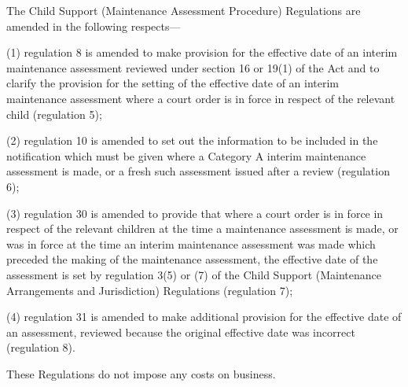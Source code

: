 \documentclass[a4paper]{article}
\begin{document}
 The Child Support (Maintenance Assessment Procedure) Regulations are amended in the following respects—

 (1) regulation 8 is amended to make provision for the effective date of an interim maintenance assessment reviewed under section 16 or 19(1) of the Act and to clarify the provision for the setting of the effective date of an interim maintenance assessment where a court order is in force in respect of the relevant child (regulation 5);

 (2) regulation 10 is amended to set out the information to be included in the notification which must be given where a Category A interim maintenance assessment is made, or a fresh such assessment issued after a review (regulation 6);

 (3) regulation 30 is amended to provide that where a court order is in force in respect of the relevant children at the time a maintenance assessment is made, or was in force at the time an interim maintenance assessment was made which preceded the making of the maintenance assessment, the effective date of the assessment is set by regulation 3(5) or (7) of the Child Support (Maintenance Arrangements and Jurisdiction) Regulations (regulation 7);

 (4) regulation 31 is amended to make additional provision for the effective date of an assessment, reviewed because the original effective date was incorrect (regulation 8).

  These Regulations do not impose any costs on business.
\end{document}
